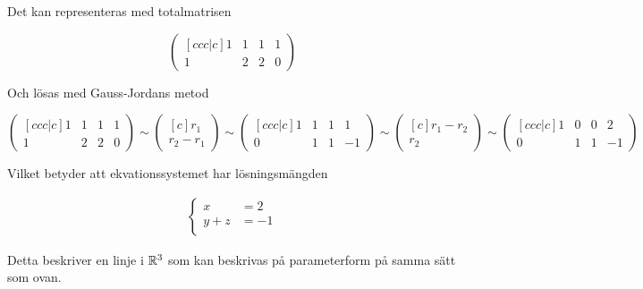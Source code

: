 \documentclass[../../main.tex]{subfiles}
\begin{document}
\begin{solution}{20}
Det kan representeras med totalmatrisen

\[
\begin{pmatrix}[ccc|c]
  1 & 1 & 1 & 1\\
  1 & 2 & 2 & 0
\end{pmatrix} 
\]

Och lösas med Gauss-Jordans metod

$$
\begin{pmatrix}[ccc|c]
  1 & 1 & 1 & 1\\
  1 & 2 & 2 & 0
\end{pmatrix} 
\sim 
\begin{pmatrix}[c]
  r_1\\
  r_2 - r_1
\end{pmatrix}
\sim 
\begin{pmatrix}[ccc|c]
  1 & 1 & 1 & 1\\
  0 & 1 & 1 & -1
\end{pmatrix} 
\sim
\begin{pmatrix}[c]
  r_1-r_2\\
  r_2
\end{pmatrix}
\sim
\begin{pmatrix}[ccc|c]
  1 & 0 & 0 & 2\\
  0 & 1 & 1 & -1
\end{pmatrix} 
$$

Vilket betyder att ekvationssystemet har lösningsmängden

\begin{align*}
    \begin{cases} 
     x&=2\\
     y+z&=-1\\
    \end{cases}
\end{align*}

Detta beskriver en linje i $\mathbb{R}^{3}$ som kan beskrivas på parameterform på samma sätt som ovan.

\end{solution}
\end{document}
